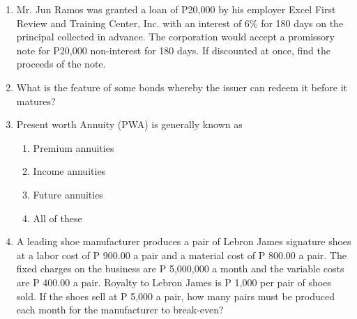 \documentclass[11pt,a4paper]{article}
\begin{document}
\begin{enumerate}
\begin{enumerate*}[itemjoin=\qquad, label=\Alph*.]
\end{enumerate*}
\item{Mr. Jun Ramos was granted a loan of P20,000 by his employer Excel First Review and Training Center, Inc. with an interest of 6\% for 180 days on the principal collected in advance. The corporation would accept a promissory note for P20,000 non-interest for 180 days. If discounted at once, find the proceeds of the note.}
\\
\item{What is the feature of some bonds whereby the issuer can redeem it before it matures?}
\\
\item{Present worth Annuity (PWA) is generally known as}
\begin{enumerate}[label=\Alph*.]
\item{Premium annuities}
\item{Income annuities}
\item{Future annuities}
\item{All of these}
\end{enumerate}
\item{A leading shoe manufacturer produces a pair of Lebron James signature shoes at a labor cost of P 900.00 a pair and a material cost of P 800.00 a pair. The fixed charges on the business are P 5,000,000 a month and the variable costs are P 400.00 a pair. Royalty to Lebron James is P 1,000 per pair of shoes sold. If the shoes sell at P 5,000 a pair, how many pairs must be produced each month for the manufacturer to break-even?}
\\
\end{enumerate}
\end{document}

